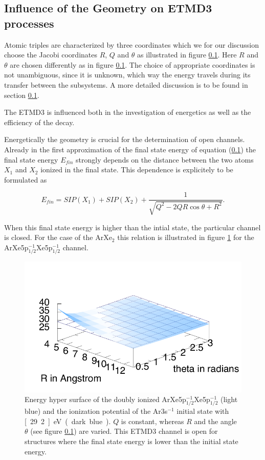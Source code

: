 \subsection{Influence of the Geometry on ETMD3 processes}
Atomic triples are characterized by three coordinates which we for
our discussion choose the Jacobi coordinates $R$, $Q$ and $\theta$ as illustrated
in figure \ref{}. Here $R$ and $\theta$ are chosen differently as in
figure \ref{}. The choice of appropriate coordinates is not unambiguous,
since it is unknown, which way the energy travels during its transfer
between the subsystems. A more detailed discussion is to be found in 
section \ref{}.

The \ac{ETMD}3 is influenced both in the investigation of energetics
as well as the efficiency of the decay.

Energetically the geometry is crucial for the determination of open channels.
Already in the first approximation of the final state energy of equation (\ref{})
the final state energy $E_{fin}$ strongly depends on the distance between the
two atoms $X_1$ and $X_2$ ionized in the final state. This dependence is explicitely to be
formulated as

\begin{equation}
  E_{fin} = SIP(X_1) + SIP(X_2) + \frac{1}{\sqrt{Q^2 - 2QR\cos\theta + R^2}} .
\end{equation}

When this final state energy is higher than the intial state, the particular
channel is closed. For the case of the ArXe$_2$ this relation is illustrated
in figure \ref{figure:ArXe2_geom_energy} for the
ArXe5p$_{1/2}^{-1}$Xe5p$_{1/2}^{-1}$ channel.

\begin{figure}[htb]
 \centering
 \includegraphics[]{pics/ArXeXe12_12_surf.pdf}
 \caption{Energy hyper surface of the doubly ionized
          ArXe5p$_{1/2}^{-1}$Xe5p$_{1/2}^{-1}$ (light blue) and the ionization
          potential of the Ar3s$^{-1}$ initial state with \unit[29.2]{eV}
          (dark blue). $Q$ is constant, whereas $R$ and the angle $\theta$
          (see figure \ref{}) are varied. This ETMD3 channel is open for
          structures where
          the final state energy is lower than the initial state energy.}
 \label{figure:ArXe2_geom_energy}
\end{figure}

